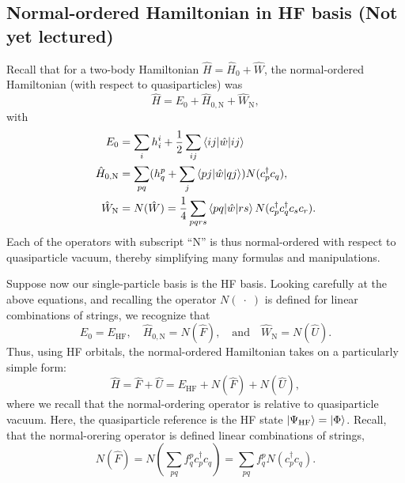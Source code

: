 \documentclass{report}
\theoremstyle{plain}
\theoremstyle{definition}
\begin{document}
\subsection{Normal-ordered Hamiltonian in HF basis (Not yet lectured)}

Recall that for a two-body Hamiltonian $\hat{H} = \hat{H}_0 +
\hat{W}$, the normal-ordered Hamiltonian (with respect to
quasiparticles) was
\begin{equation}
  \hat{H} = E_0 + \hat{H}_{0,\text{N}} + \hat{W}_\text{N}, 
\end{equation}
with
\begin{align}
  E_0 &= \sum_i h^i_i + \frac{1}{2}\sum_{ij} \braket{ij|\hat{w}|ij} \\
  \hat{H}_{0,\text{N}} &= \sum_{pq} (h^p_q + \sum_j \braket{pj|\hat{w}|qj})
  N(c^\dag_p c_q), \\
  \hat{W}_\text{N} &= N(\hat{W}) = \frac{1}{4}\sum_{pqrs} \braket{pq|\hat{w}|rs} N(c^\dag_p
  c^\dag_q c_s c_r).
\end{align}
Each of the operators with subscript ``N'' is thus normal-ordered with
respect to quasiparticle vacuum, thereby simplifying many formulas and
manipulations.

Suppose now our single-particle basis is the HF basis.
Looking carefully at the above equations, and recalling the operator
$N(\; \cdot \;)$ is defined for linear combinations of strings, we recognize that
\begin{equation}
  E_0 = E_\text{HF}, \quad \hat{H}_{0,\text{N}} = N(\hat{F}), \quad\text{and}\quad \hat{W}_\text{N} =
  N(\hat{U}).
\end{equation}
Thus, using HF orbitals, the
normal-ordered Hamiltonian takes on a particularly simple form:
\begin{equation}
  \hat{H} = \hat{F} + \hat{U} = E_\text{HF} +
  N(\hat{F}) + N(\hat{U}),
\end{equation}
where we recall that the normal-ordering operator is relative to
quasiparticle vacuum. Here, the quasiparticle reference is the HF
state $\ket{\Psi_\text{HF}} = \ket{\Phi}$. Recall, that the
normal-orering operator is defined linear combinations of strings,
\begin{equation}
  N(\hat{F}) = N\left(\sum_{pq} f^{p}_q c^\dag_p c_q\right) =
  \sum_{pq} f^p_q N(c^\dag_p c_q).
\end{equation}
\end{document}
